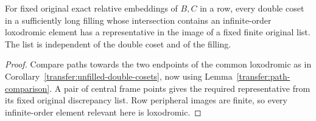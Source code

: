 \begin{corollary}
\label{transfer:double-cosets}
For fixed original exact relative embeddings of $B,C$ in a row,
every double coset in a sufficiently long filling whose intersection
contains an infinite-order loxodromic element has a representative
in the image of a fixed finite original list. The list is independent
of the double coset and of the filling.
\end{corollary}
\begin{proof}
Compare paths towards the two endpoints of the common loxodromic
as in Corollary~\ref{transfer:unfilled-double-cosets}, now using
Lemma~\ref{transfer:path-comparison}. A pair of central frame points
gives the required representative from its fixed original discrepancy
list. Row peripheral images are finite, so every infinite-order
element relevant here is loxodromic.
\end{proof}


